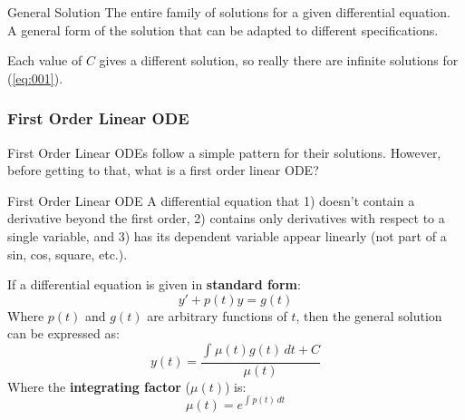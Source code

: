 \documentclass[12pt]{article}
\begin{document}
\begin{definition}{General Solution}
  The entire family of solutions for a given differential equation. A general form of the solution that can be adapted to different specifications.
\end{definition}

Each value of $C$ gives a different solution, so really there are infinite solutions for (\ref{eq:001}).

\subsubsection{First Order Linear ODE}
\label{sssec:firstOrderLinearODE}

First Order Linear ODEs follow a simple pattern for their solutions. However, before getting to that, what is a first order linear ODE?

\begin{definition}{First Order Linear ODE}
  A differential equation that 1) doesn't contain a derivative beyond the first order, 2) contains only derivatives with respect to a single variable, and 3) has its dependent variable appear linearly (not part of a sin, cos, square, etc.).
\end{definition}

If a differential equation is given in \textbf{standard form}:
\begin{equation*}
  y' + p(t)y = g(t)
\end{equation*}
Where $p(t)$ and $g(t)$ are arbitrary functions of $t$, then the general solution can be expressed as:
\begin{equation*}
  y(t) = \frac{\int_{}^{} \mu(t)g(t) \,dt + C}{\mu(t)}
\end{equation*}
Where the \textbf{integrating factor} ($\mu(t)$) is:
\begin{equation*}
  \mu(t) = e^{\int_{}^{} p(t) \,dt}
\end{equation*}
\end{document}
